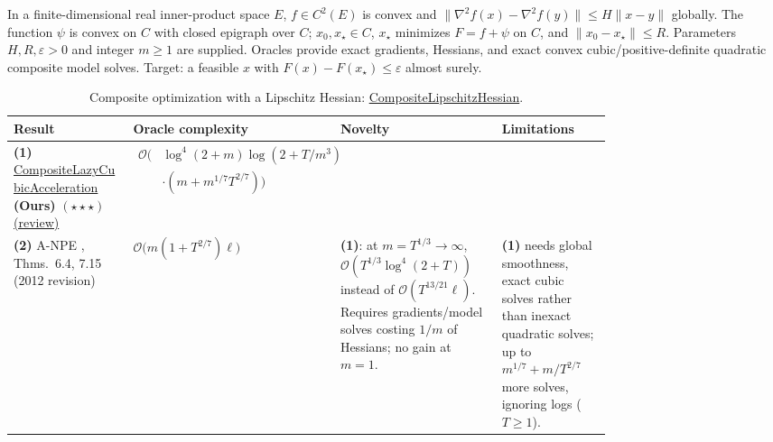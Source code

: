 \begin{table}[tp]
\centering
\caption{Composite optimization with a Lipschitz Hessian: \href{https://github.com/k3nfalt/longtails/blob/main/LongTails/Setups/CompositeLipschitzHessian.lean}{CompositeLipschitzHessian}.}\label{tab:CompositeLipschitzHessian}
\parbox{\linewidth}{\footnotesize In a finite-dimensional real inner-product space $E$, $f\in C^2(E)$ is convex and $\|\nabla^2 f(x)-\nabla^2 f(y)\|\le H\|x-y\|$ globally. The function $\psi$ is convex on $C$ with closed epigraph over $C$; $x_0,x_\star\in C$, $x_\star$ minimizes $F=f+\psi$ on $C$, and $\|x_0-x_\star\|\le R$. Parameters $H,R,\varepsilon>0$ and integer $m\ge1$ are supplied. Oracles provide exact gradients, Hessians, and exact convex cubic/positive-definite quadratic composite model solves. Target: a feasible $x$ with $F(x)-F(x_\star)\le\varepsilon$ almost surely.}\par\smallskip
\begin{threeparttable}
\footnotesize
\setlength{\tabcolsep}{4pt}\renewcommand{\arraystretch}{1.25}
\begin{tabularx}{\linewidth}{@{}>{\raggedright\arraybackslash}p{0.20\linewidth}>{\raggedright\arraybackslash}p{0.30\linewidth}>{\raggedright\arraybackslash}p{0.27\linewidth}>{\raggedright\arraybackslash}X@{}}
\toprule
\textbf{Result} & \textbf{Oracle complexity} & \textbf{Novelty} & \textbf{Limitations} \\
\midrule
\textbf{(1)} \href{https://github.com/k3nfalt/longtails/blob/main/LongTails/Theorems/CompositeLazyCubicAcceleration.lean}{Composite\allowbreak Lazy\allowbreak Cubic\allowbreak Acceleration} \textbf{(Ours)} $(\star\star\star)$ \href{https://github.com/k3nfalt/longtails/blob/main/scripts/reviews/CompositeLazyCubicAcceleration.md}{(review)}
& $\begin{aligned}\mathcal{O}\bigl(&\log^4(2+m)\log(2+T/m^3)\\ &\cdot(m+m^{1/7}T^{2/7})\bigr)\end{aligned}$ & & \\
\midrule[1.2pt]
\textbf{(2)} A-NPE \citep{CompositeLHMonteiroSvaiter2013}, Thms.~6.4, 7.15 (2012 revision)
& $\mathcal{O}\bigl(m(1+T^{2/7})\ell\bigr)$
& \textbf{(1)}: at $m=T^{1/3}\to\infty$, $\mathcal{O}(T^{1/3}\log^4(2+T))$ instead of $\mathcal{O}(T^{13/21}\ell)$. Requires gradients/model solves costing $1/m$ of Hessians; no gain at $m=1$.
& \textbf{(1)} needs global smoothness, exact cubic solves rather than inexact quadratic solves; up to $m^{1/7}+m/T^{2/7}$ more solves, ignoring logs ($T\ge1$). \\

\end{tabularx}
\end{threeparttable}
\end{table}
